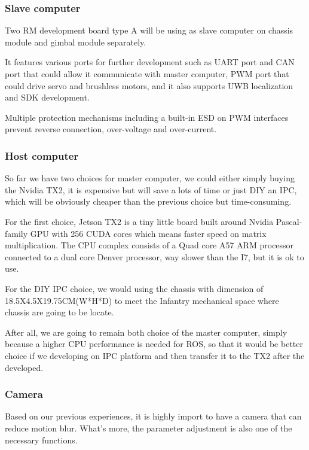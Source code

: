 \subsubsection{Slave computer}

Two RM development board type A will be using as slave computer on chassis module and gimbal module separately.

It features various ports for further development such as UART port and CAN port that could allow it communicate with master computer, PWM port that could drive servo and brushless motors, and it also supports UWB localization and SDK development.

Multiple protection mechanisms including a built-in ESD on PWM interfaces prevent reverse connection, over-voltage and over-current.

\subsubsection{Host computer}
So far we have two choices for master computer, we could either simply buying the Nvidia TX2, it is expensive but will save a lots of time or just DIY an IPC, which will be obviously cheaper than the previous choice but time-consuming.

For the first choice, Jetson TX2 is a tiny little board built around Nvidia Pascal-family GPU with 256 CUDA cores which means faster speed on matrix multiplication.
The CPU complex consists of a Quad core A57 ARM processor connected to a dual core Denver processor, way slower than the I7, but it is ok to use.

For the DIY IPC choice, we would using the chassis with dimension of 18.5X4.5X19.75CM(W*H*D) to meet the Infantry mechanical space where chassis are going to be locate.

After all, we are going to remain both choice of the master computer, simply because a higher CPU performance is needed for ROS, so that it would be better choice if we developing on IPC platform and then transfer it to the TX2 after the developed.

\subsubsection{Camera}

Based on our previous experiences, it is highly import to have a camera that can reduce motion blur.
What’s more, the parameter adjustment is also one of the necessary functions.

